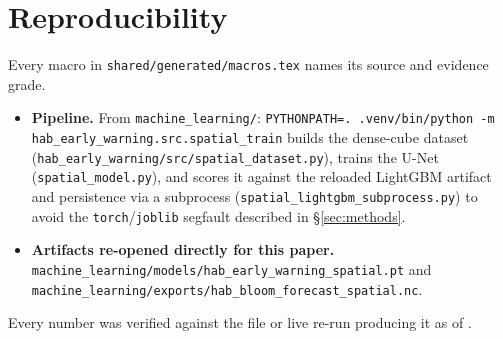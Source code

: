 \documentclass[conference]{IEEEtran}
\begin{document}
\section*{Reproducibility}
Every macro in \texttt{shared/generated/macros.tex} names its source and
evidence grade.
{\raggedright\sloppy
\begin{itemize}\itemsep1pt\parskip0pt
\item[] \textbf{Pipeline.} From \texttt{machine\_learning/}:
\texttt{PYTHONPATH=. .venv/bin/python\allowbreak{} -m\allowbreak{}
hab\_early\_warning.src.spatial\_train} builds the dense-cube dataset
(\texttt{hab\_early\_warning/src/\allowbreak{}spatial\_dataset.py}), trains
the U-Net (\texttt{spatial\_model.py}), and scores it against the reloaded
LightGBM artifact and persistence via a subprocess
(\texttt{spatial\_lightgbm\_subprocess.py}) to avoid the
\texttt{torch}/\texttt{joblib} segfault described in \S\ref{sec:methods}.
\item[] \textbf{Artifacts re-opened directly for this paper.}
\texttt{machine\_learning/models/\allowbreak{}hab\_early\_warning\_spatial.pt}
and
\texttt{machine\_learning/exports/\allowbreak{}hab\_bloom\_forecast\_spatial.nc}.
\end{itemize}}
Every number was verified against the file or live re-run producing it as
of \AsOf{}.



\end{document}
